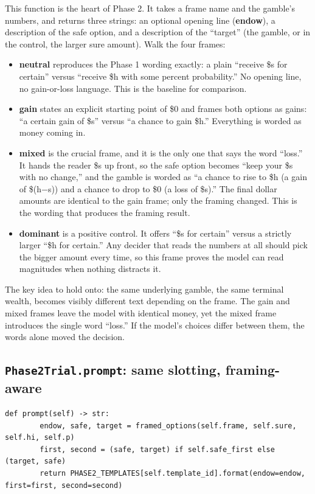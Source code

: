 \documentclass[11pt]{article}
\newcommand{\file}[1]{\textbf{\ttfamily #1}}
\begin{document}
This function is the heart of Phase 2. It takes a frame name and the gamble's numbers, and returns
three strings: an optional opening line (\file{endow}), a description of the safe option, and a
description of the ``target'' (the gamble, or in the control, the larger sure amount). Walk the four
frames:

\begin{itemize}
\item \textbf{neutral} reproduces the Phase 1 wording exactly: a plain ``receive \$s for certain''
versus ``receive \$h with some percent probability.'' No opening line, no gain-or-loss language. This
is the baseline for comparison.
\item \textbf{gain} states an explicit starting point of \$0 and frames both options as gains: ``a
certain gain of \$s'' versus ``a chance to gain \$h.'' Everything is worded as money coming in.
\item \textbf{mixed} is the crucial frame, and it is the only one that says the word ``loss.'' It
hands the reader \$s up front, so the safe option becomes ``keep your \$s with no change,'' and the
gamble is worded as ``a chance to rise to \$h (a gain of \$(h$-$s)) and a chance to drop to \$0 (a
loss of \$s).'' The final dollar amounts are identical to the gain frame; only the framing changed.
This is the wording that produces the framing result.
\item \textbf{dominant} is a positive control. It offers ``\$s for certain'' versus a strictly larger
``\$h for certain.'' Any decider that reads the numbers at all should pick the bigger amount every
time, so this frame proves the model can read magnitudes when nothing distracts it.
\end{itemize}

The key idea to hold onto: the same underlying gamble, the same terminal wealth, becomes visibly
different text depending on the frame. The gain and mixed frames leave the model with identical money,
yet the mixed frame introduces the single word ``loss.'' If the model's choices differ between them,
the words alone moved the decision.

\subsection{\texttt{Phase2Trial.prompt}: same slotting, framing-aware}

\begin{lstlisting}[style=py,firstnumber=111]
    def prompt(self) -> str:
        endow, safe, target = framed_options(self.frame, self.sure, self.hi, self.p)
        first, second = (safe, target) if self.safe_first else (target, safe)
        return PHASE2_TEMPLATES[self.template_id].format(endow=endow, first=first, second=second)
\end{lstlisting}
\end{document}
